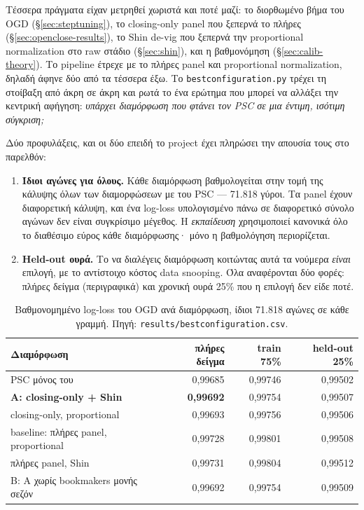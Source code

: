 \documentclass[11pt,a4paper]{article}
\newcommand{\file}[1]{\texttt{#1}}
\renewcommand{\_}{\oldunderscore\allowbreak}
\begin{document}
Τέσσερα πράγματα είχαν μετρηθεί χωριστά και ποτέ μαζί: το διορθωμένο βήμα του OGD
(\S\ref{sec:steptuning}), το closing-only panel που ξεπερνά το πλήρες
(\S\ref{sec:openclose-results}), το Shin de-vig που ξεπερνά την proportional normalization
στο raw στάδιο (\S\ref{sec:shin}), και η βαθμονόμηση (\S\ref{sec:calib-theory}). Το
pipeline έτρεχε με το πλήρες panel και proportional normalization, δηλαδή άφηνε δύο από τα
τέσσερα έξω. Το \file{best\_configuration.py} τρέχει τη στοίβαξη από άκρη σε άκρη και ρωτά το
ένα ερώτημα που μπορεί να αλλάξει την κεντρική αφήγηση: \emph{υπάρχει διαμόρφωση που φτάνει
τον PSC σε μια έντιμη, ισότιμη σύγκριση;}

Δύο προφυλάξεις, και οι δύο επειδή το project έχει πληρώσει την απουσία τους στο παρελθόν:

\begin{enumerate}
  \item \textbf{Ίδιοι αγώνες για όλους.} Κάθε διαμόρφωση βαθμολογείται στην τομή της κάλυψης
        όλων των διαμορφώσεων με του PSC --- 71.818 γύροι. Τα panel έχουν διαφορετική κάλυψη,
        και ένα log-loss υπολογισμένο πάνω σε διαφορετικό σύνολο αγώνων δεν είναι συγκρίσιμο
        μέγεθος. Η \emph{εκπαίδευση} χρησιμοποιεί κανονικά όλο το διαθέσιμο εύρος κάθε
        διαμόρφωσης· μόνο η βαθμολόγηση περιορίζεται.
  \item \textbf{Held-out ουρά.} Το να διαλέγεις διαμόρφωση κοιτώντας αυτά τα νούμερα
        \emph{είναι} επιλογή, με το αντίστοιχο κόστος data snooping. Όλα αναφέρονται δύο
        φορές: πλήρες δείγμα (περιγραφικά) και χρονική ουρά 25\% που η επιλογή δεν είδε ποτέ.
\end{enumerate}

\begin{table}[htbp]
\centering
\small
\begin{tabular}{@{}lrrr@{}}
\toprule
\textbf{Διαμόρφωση} & \textbf{πλήρες δείγμα} & \textbf{train 75\%} & \textbf{held-out 25\%} \\
\midrule
PSC μόνος του                            & 0,99685 & 0,99746 & 0,99502 \\
\textbf{A: closing-only + Shin}          & \textbf{0,99692} & 0,99754 & 0,99507 \\
closing-only, proportional               & 0,99693 & 0,99756 & 0,99506 \\
baseline: πλήρες panel, proportional     & 0,99728 & 0,99801 & 0,99508 \\
πλήρες panel, Shin                       & 0,99731 & 0,99804 & 0,99512 \\
B: A χωρίς bookmakers μονής σεζόν        & 0,99692 & 0,99754 & 0,99509 \\
\bottomrule
\end{tabular}
\caption{Βαθμονομημένο log-loss του OGD ανά διαμόρφωση, ίδιοι 71.818 αγώνες σε κάθε γραμμή.
Πηγή: \file{results/best\_configuration.csv}.}
\label{tab:bestconfig}
\end{table}
\end{document}
